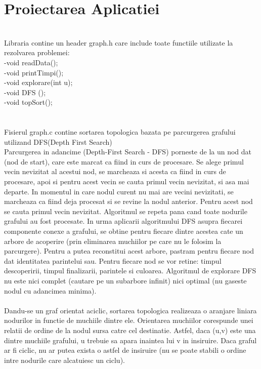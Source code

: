 \documentclass[14pt]{article}
\begin{document}
\section*{Proiectarea Aplicatiei}
\vspace{10 mm}
\\Libraria contine un header graph.h care include toate functiile utilizate la
rezolvarea problemei:
\\-void readData();
\\-void printTimpi();
\\-void explorare(int u);
\\-void DFS ();
\\-void topSort();
\\\vspace{3 mm}
\\
\\Fisierul graph.c contine sortarea topologica bazata pe parcurgerea grafului utilizand DFS(Depth First Search)
\\Parcurgerea in adancime (Depth-First Search - DFS) porneste de la un nod dat (nod de start), care este marcat ca fiind in curs de procesare. Se alege primul vecin nevizitat al acestui nod, se marcheaza si acesta ca fiind in curs de procesare, apoi si pentru acest vecin se cauta primul vecin nevizitat, si asa mai departe. In momentul in care nodul curent nu mai are vecini nevizitati, se marcheaza ca fiind deja procesat si se revine la nodul anterior. Pentru acest nod se cauta primul vecin nevizitat. Algoritmul se repeta pana cand toate nodurile grafului au fost procesate. In urma aplicarii algoritmului DFS asupra fiecarei componente conexe a grafului, se obtine pentru fiecare dintre acestea cate un arbore de acoperire (prin eliminarea muchiilor pe care nu le folosim la parcurgere). Pentru a putea reconstitui acest arbore, pastram pentru fiecare nod dat identitatea parintelui sau.
Pentru fiecare nod se vor retine: timpul descoperirii, timpul finalizarii, parintele si culoarea.
Algoritmul de explorare DFS nu este nici complet (cautare pe un subarbore infinit) nici optimal (nu gaseste nodul cu adancimea minima).
\\
\\Dandu-se un graf orientat aciclic, sortarea topologica realizeaza o aranjare liniara nodurilor in functie de muchiile dintre ele. Orientarea muchiilor corespunde unei relatii de ordine de la nodul sursa catre cel destinatie. Astfel, daca (u,v) este una dintre muchiile grafului, u trebuie sa apara inaintea lui v in insiruire. Daca graful ar fi ciclic, nu ar putea exista o astfel de insiruire (nu se poate stabili o ordine intre nodurile care alcatuiesc un ciclu).
\end{document}
